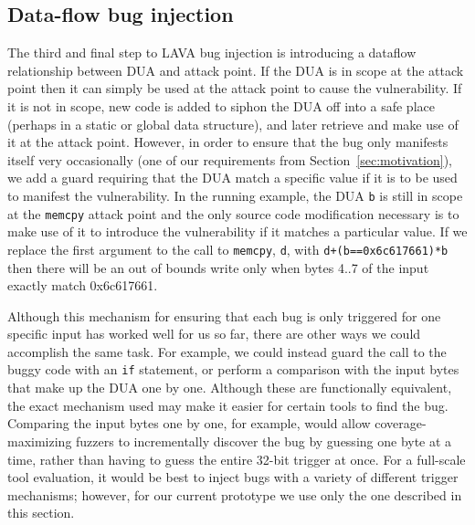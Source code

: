 \subsection {Data-flow bug injection}

The third and final step to LAVA bug injection is introducing a dataflow relationship between DUA and attack point.  
If the DUA is in scope at the attack point then it can simply be used at the attack point to cause the vulnerability.
If it is not in scope, new code is added to siphon the DUA off into a safe place (perhaps in a static or global data structure), and later retrieve and make use of it at the attack point. 
However, in order to ensure that the bug only manifests itself very occasionally (one of our requirements from Section~\ref{sec:motivation}), we add a guard requiring that the DUA match a specific value if it is to be used to manifest the vulnerability.
In the running example, the DUA \verb+b+ is still in scope at the \verb+memcpy+ attack point and the only source code modification necessary is to make use of it to introduce the vulnerability if it matches a particular value.  
If we replace the first argument to the call to \verb+memcpy+, \verb+d+, with \verb-d+(b==0x6c617661)*b- then there will be an out of bounds write only when bytes 4..7 of the input exactly match 0x6c617661. 

Although this mechanism for ensuring that each bug is only triggered for one specific input has worked well for us so far, there are other ways we could accomplish the same task.
For example, we could instead guard the call to the buggy code with an \verb+if+ statement, or perform a comparison with the input bytes that make up the DUA one by one.
Although these are functionally equivalent, the exact mechanism used may make it easier for certain tools to find the bug.
Comparing the input bytes one by one, for example, would allow coverage-maximizing fuzzers 
to incrementally discover the bug by guessing one byte at a time, rather than having to guess the entire 32-bit trigger at once.
For a full-scale tool evaluation, it would be best to inject bugs with a variety of different trigger mechanisms; however, for our current prototype we use only the one described in this section.
